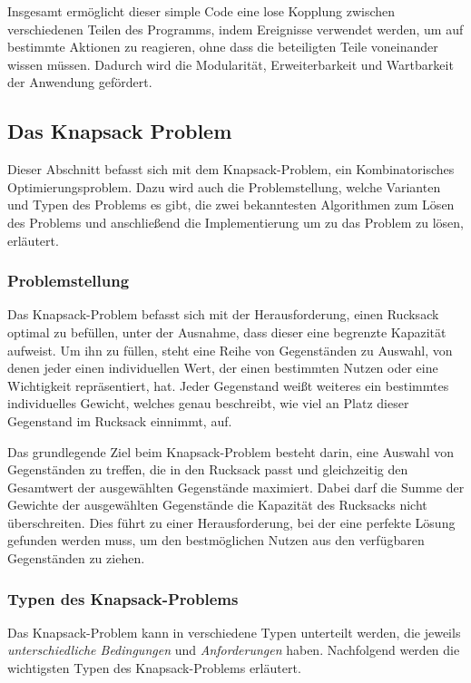 Insgesamt ermöglicht dieser simple Code eine lose Kopplung zwischen verschiedenen Teilen des Programms, indem Ereignisse verwendet
werden, um auf bestimmte Aktionen zu reagieren, ohne dass die beteiligten Teile voneinander wissen müssen. Dadurch wird die
Modularität, Erweiterbarkeit und Wartbarkeit der Anwendung gefördert.

\subsection{Das Knapsack Problem} 
Dieser Abschnitt befasst sich mit dem Knapsack-Problem, ein Kombinatorisches Optimierungsproblem. Dazu wird auch die
Problemstellung, welche Varianten und Typen des Problems es gibt, die zwei bekanntesten Algorithmen zum Lösen des Problems
und anschließend die Implementierung um zu das Problem zu lösen, erläutert.

\subsubsection{Problemstellung}
Das Knapsack-Problem befasst sich mit der Herausforderung, einen Rucksack optimal zu befüllen, unter der Ausnahme, dass
dieser eine begrenzte Kapazität aufweist. Um ihn zu füllen, steht eine Reihe von Gegenständen zu Auswahl, von denen jeder
einen individuellen Wert, der einen bestimmten Nutzen oder eine Wichtigkeit repräsentiert, hat. Jeder Gegenstand weißt
weiteres ein bestimmtes individuelles Gewicht, welches genau beschreibt, wie viel an Platz dieser Gegenstand im Rucksack
einnimmt, auf.

Das grundlegende Ziel beim Knapsack-Problem besteht darin, eine Auswahl von Gegenständen zu treffen, die in den Rucksack
passt und gleichzeitig den Gesamtwert der ausgewählten Gegenstände maximiert. Dabei darf die Summe der Gewichte der
ausgewählten Gegenstände die Kapazität des Rucksacks nicht überschreiten. Dies führt zu einer Herausforderung, bei der
eine perfekte Lösung gefunden werden muss, um den bestmöglichen Nutzen aus den verfügbaren Gegenständen zu ziehen.

\subsubsection{Typen des Knapsack-Problems}\label{sec:knapsackTypen}
Das Knapsack-Problem kann in verschiedene Typen unterteilt werden, die jeweils \textit{unterschiedliche Bedingungen}
und \textit{Anforderungen} haben. Nachfolgend werden die wichtigsten Typen des Knapsack-Problems erläutert.

